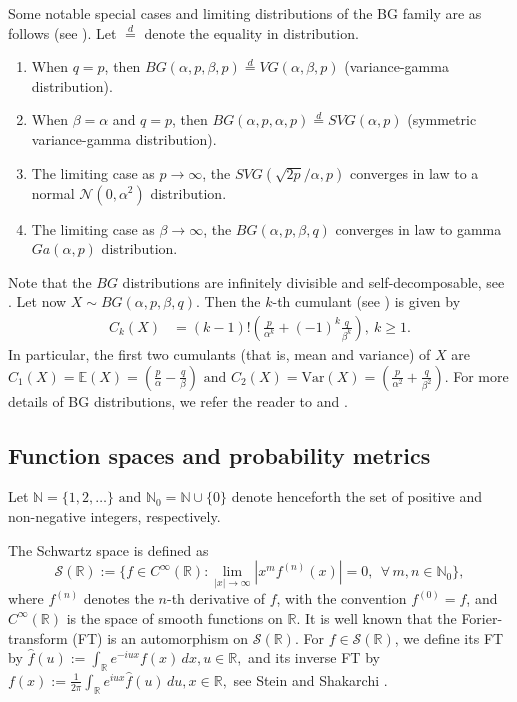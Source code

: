 \documentclass[12pt, a4paper,reqno]{amsart}
\theoremstyle{definition}
\theoremstyle{myremark}
\numberwithin{equation}{section}
\begin{document}
\noindent
Some notable special cases and limiting distributions of the BG family are as follows
(see \cite{bilateral0}). Let $\overset{d}{=}$ denote the equality in distribution.
\begin{enumerate}
	\item[(i)] When $q=p$, then $BG(\alpha,p,\beta,p)\overset{d}{=}VG(\alpha,\beta,p)$ (variance-gamma  distribution).
	
	\item [(ii)] When $\beta=\alpha$ and $q=p$, then $BG(\alpha,p,\alpha,p)\overset{d}{=}SVG(\alpha,p)$ (symmetric variance-gamma distribution).
		
	\item [(iii)] The limiting case as $p\to \infty$,  the $SVG( \sqrt{2p}/\alpha,p)$ converges in law to a normal $\mathcal{N}(0,\alpha^2)$ distribution.
	
	\item [(iv)] The limiting case as $\beta \to \infty$, the $BG(\alpha,p,\beta,q)$ converges in law to gamma $Ga(\alpha,p)$ distribution.
\end{enumerate}
\noindent
Note that the $BG$ distributions are infinitely divisible and self-decomposable, see \cite{bilateral0}. Let now $X\sim BG(\alpha,p,\beta,q)$. Then the $k$-th cumulant (see \cite[Section 2]{bilateral0}) is given by
\begin{align}
C_{k}(X)&=(k-1)!\left(\frac{p}{\alpha^k}+(-1)^k \frac{q}{\beta^k}  \right),~k\geq 1. \label{cuforbg}
\end{align}
\noindent
In particular, the first two cumulants (that is, mean and variance) of $X$ are 
$C_1(X)=\mathbb{E}(X)= \left(\frac{p}{\alpha}-\frac{q}{\beta}\right) \text{ and } C_{2}(X)=\text{Var}(X)=\left(\frac{p}{\alpha^{2}}+\frac{q}{\beta^{2}}\right).$ For more details of BG distributions, we refer the reader to  \cite{bilateral0} and \cite{bilateral1}.


\subsection{Function spaces and probability metrics}\label{PP2:FS}
Let $\mathbb{N} = \{1,2,\ldots\} \text{ and }
\mathbb{N}_{0} = \mathbb{N} \cup \{0\}$ denote henceforth the set of positive and 
non-negative integers, respectively. 

The Schwartz space is defined as
\[
\mathcal{S}(\mathbb{R})
  := \Big\{ f \in C^{\infty}(\mathbb{R}) :
        \lim_{|x|\to\infty} |x^{m} f^{(n)}(x)| = 0,
        \ \ \forall\, m,n \in \mathbb{N}_{0}
     \Big\},
\]
where $f^{(n)}$ denotes the $n$-th derivative of $f$, with the convention $f^{(0)} = f$, and 
$C^\infty(\mathbb{R})$ is the space of smooth functions on $\mathbb{R}$. It is well known that the Forier-transform (FT) is an automorphism on $\mathcal{S}(\mathbb{R})$.  
For $f \in \mathcal{S}(\mathbb{R})$, we define its FT by $\widehat{f}(u)
   := \int_{\mathbb{R}} e^{-iux} f(x)\, dx,
    u \in \mathbb{R},$ and its inverse FT by $f(x)
   := \frac{1}{2\pi} \int_{\mathbb{R}} e^{iux} \widehat{f}(u)\, du,
   x \in \mathbb{R},$ see Stein and Shakarchi \cite{stein}.
\end{document}
